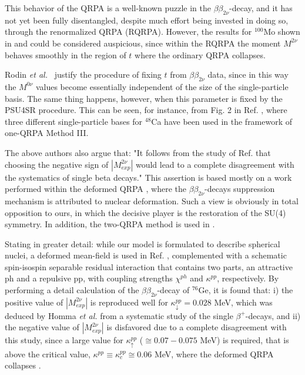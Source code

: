 \documentclass[nofootinbib,twocolumn,eqsecnum,floats,aps]{revtex4}
\def\etal {{\it et al.}}
\def\b {{\beta}}
\begin{document}
{This behavior of the QRPA  is a well-known puzzle
in the $\b\b_{2\nu}$-decay, and it has not yet been fully disentangled, despite much effort being invested in doing so, through the renormalized QRPA (RQRPA)\cite{Krm97,Toi95,Rod02}.
However, the results for  $^{100}$Mo shown  in \cite[Fig. 3]{Krm97} and \cite[Fig. 3]{Toi95} could be considered  auspicious,
since within the RQRPA the  moment $M^{2\nu}$ behaves smoothly in the region of $t$ where the ordinary QRPA collapses.

Rodin \etal~ \cite{Rod06}   justify the procedure of fixing $t$ from  $\b\b_{2\nu}$
data, since in this way the $M^{0\nu}$ values become essentially independent
of the size of the single-particle basis.
The same thing happens, however, when this parameter is fixed by the PSU4SR %
procedure. This can be seen, for instance, from Fig. 2 in Ref. \cite{Krm94},
where three different single-particle bases for  $^{48}$Ca
have been used in the framework of one-QRPA  Method  III.

The above authors  \cite{Rod06} also argue that:
"It follows from the study of Ref. \cite{Sim04} that choosing
the negative sign of $|M^{2\nu}_{exp}|$  would lead to a complete disagreement
with the systematics of single beta decays."
This assertion  is based  mostly on a work performed within the deformed QRPA  \cite{Sim04}, where the $\b\b_{2\nu}$-decays suppression mechanism  is attributed to nuclear deformation. Such a view is obviously in total opposition to ours, in which the decisive player is the restoration of the SU(4) symmetry. In addition, the two-QRPA method is used in  \cite{Sim04}.

Stating in greater  detail:  while
 our model is formulated to describe spherical nuclei, a deformed mean-field  is used in  Ref. \cite{Sim04}, complemented with a schematic spin-isospin separable residual interaction that
contains two parts, an attractive ph and a repulsive pp, with  coupling strengths $\chi^{ph}$ and $\kappa^{pp}$, respectively. 
By  performing a detail calculation of the $\b\b_{2\nu}$-decay of  $^{76}$Ge, it is found that:  i) the positive value of  $|M^{2\nu}_{exp}|$ is reproduced well for $\kappa^{pp}_\downarrow=0.028$ MeV,  which was deduced by Homma \etal  \cite{Hom96} from a systematic study of the single $\b^+$-decays, and ii)  the negative value of $|M^{2\nu}_{exp}|$ is disfavored due to a complete disagreement
 with  this study, since 
 a large value for   $\kappa^{pp}_\uparrow$  ($\cong 0.07- 0.075$ MeV) is required, %
that is above the critical value, $\kappa^{pp}\equiv\kappa^{pp}_c\cong 0.06$ MeV,  where the deformed QRPA collapses \cite {Hom96}.

}
\end{document}
